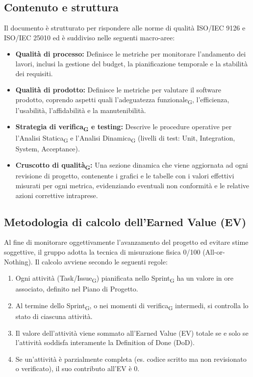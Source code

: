 \documentclass[11pt,a4paper]{article}
\newcommand{\gls}[1]{#1\textsubscript{G}}
\begin{document}
\subsection{Contenuto e struttura}
Il documento è strutturato per rispondere alle norme di qualità ISO/IEC 9126 e ISO/IEC 25010 ed è suddiviso nelle seguenti macro-aree:
\begin{itemize}
    \item \textbf{Qualità di processo:} Definisce le metriche per monitorare l'andamento dei lavori, inclusi la gestione del budget, la pianificazione temporale e la stabilità dei requisiti.
    \item \textbf{Qualità di prodotto:} Definisce le metriche per valutare il software prodotto, coprendo aspetti quali l'\gls{adeguatezza funzionale}, l'efficienza, l'usabilità, l'affidabilità e la manutenibilità.
    \item \textbf{Strategia di \gls{verifica} e testing:} Descrive le procedure operative per l'\gls{Analisi Statica} e l'\gls{Analisi Dinamica} (livelli di test: Unit, Integration, System, Acceptance).
    \item \textbf{\gls{Cruscotto di qualità}:} Una sezione dinamica che viene aggiornata ad ogni revisione di progetto, contenente i grafici e le tabelle con i valori effettivi misurati per ogni metrica, evidenziando eventuali non conformità e le relative azioni correttive intraprese.
\end{itemize}

\subsection{Metodologia di calcolo dell'Earned Value (EV)}
Al fine di monitorare oggettivamente l'avanzamento del progetto ed evitare stime soggettive, il gruppo adotta la tecnica di misurazione fisica 0/100 (All-or-Nothing).
Il calcolo avviene secondo le seguenti regole: 
\begin{enumerate} 
    \item Ogni attività (Task/\gls{Issue}) pianificata nello \gls{Sprint} ha un valore in ore associato, definito nel Piano di Progetto.
    \item Al termine dello \gls{Sprint}, o nei momenti di \gls{verifica} intermedi, si controlla lo stato di ciascuna attività. 
    \item Il valore dell'attività viene sommato all'Earned Value (EV) totale se e solo se l'attività soddisfa interamente la Definition of Done (DoD). \item Se un'attività è parzialmente completa (es. codice scritto ma non revisionato o verificato), il suo contributo all'EV è 0.
\end{enumerate} 
\end{document}
